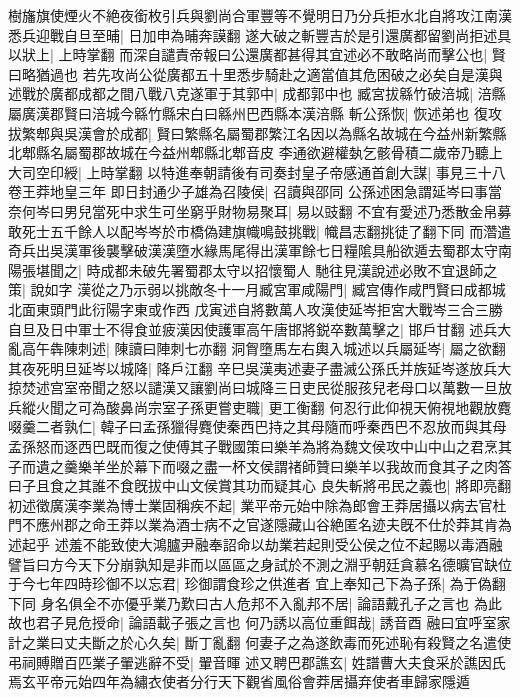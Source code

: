 樹旛旗使煙火不絶夜銜枚引兵與劉尚合軍豐等不覺明日乃分兵拒水北自將攻江南漢悉兵迎戰自旦至晡|{
	日加申為晡奔謨翻}
遂大破之斬豐吉於是引還廣都留劉尚拒述具以狀上|{
	上時掌翻}
而深自譴責帝報曰公還廣都甚得其宜述必不敢略尚而擊公也|{
	賢曰略猶過也}
若先攻尚公從廣都五十里悉步騎赴之適當值其危困破之必矣自是漢與述戰於廣都成都之間八戰八克遂軍于其郭中|{
	成都郭中也}
臧宮拔緜竹破涪城|{
	涪縣屬廣漢郡賢曰涪城今緜竹縣宋白曰緜州巴西縣本漢涪縣}
斬公孫恢|{
	恢述弟也}
復攻拔繁郫與吳漢會於成都|{
	賢曰繁縣名屬蜀郡繁江名因以為縣名故城在今益州新繁縣北郫縣名屬蜀郡故城在今益州郫縣北郫音皮}
李通欲避權埶乞骸骨積二歲帝乃聽上大司空印綬|{
	上時掌翻}
以特進奉朝請後有司奏封皇子帝感通首創大謀|{
	事見三十八卷王莽地皇三年}
即日封通少子雄為召陵侯|{
	召讀與邵同}
公孫述困急謂延岑曰事當奈何岑曰男兒當死中求生可坐窮乎財物易聚耳|{
	易以豉翻}
不宜有愛述乃悉散金帛募敢死士五千餘人以配岑岑於市橋偽建旗幟鳴鼓挑戰|{
	幟昌志翻挑徒了翻下同}
而濳遣奇兵出吳漢軍後襲擊破漢漢墮水緣馬尾得出漢軍餘七日糧隂具船欲遁去蜀郡太守南陽張堪聞之|{
	時成都未破先署蜀郡太守以招懷蜀人}
馳往見漢說述必敗不宜退師之策|{
	說如字}
漢從之乃示弱以挑敵冬十一月臧宮軍咸陽門|{
	臧宫傳作咸門賢曰成都城北面東頭門此衍陽字東或作西}
戊寅述自將數萬人攻漢使延岑拒宮大戰岑三合三勝自旦及日中軍士不得食並疲漢因使護軍高午唐邯將鋭卒數萬擊之|{
	邯戶甘翻}
述兵大亂高午犇陳刺述|{
	陳讀曰陣刺七亦翻}
洞胷墮馬左右輿入城述以兵屬延岑|{
	屬之欲翻}
其夜死明旦延岑以城降|{
	降戶江翻}
辛巳吳漢夷述妻子盡滅公孫氏并族延岑遂放兵大掠焚述宫室帝聞之怒以譴漢又讓劉尚曰城降三日吏民從服孩兒老母口以萬數一旦放兵縱火聞之可為酸鼻尚宗室子孫更嘗吏職|{
	更工衡翻}
何忍行此仰視天俯視地觀放麑啜羹二者孰仁|{
	韓子曰孟孫獵得麑使秦西巴持之其母隨而呼秦西巴不忍放而與其母孟孫怒而逐西巴既而復之使傅其子戰國策曰樂羊為將為魏文侯攻中山中山之君烹其子而遺之羹樂羊坐於幕下而啜之盡一杯文侯謂禇師贊曰樂羊以我故而食其子之肉答曰子且食之其誰不食旣拔中山文侯賞其功而疑其心}
良失斬將弔民之義也|{
	將即亮翻}
初述徵廣漢李業為博士業固稱疾不起|{
	業平帝元始中除為郎會王莽居攝以病去官杜門不應州郡之命王莽以業為酒士病不之官遂隱藏山谷絶匿名迹夫旣不仕於莽其肯為述起乎}
述羞不能致使大鴻臚尹融奉詔命以劫業若起則受公侯之位不起賜以毒酒融譬旨曰方今天下分崩孰知是非而以區區之身試於不測之淵乎朝廷貪慕名德曠官缺位于今七年四時珍御不以忘君|{
	珍御謂食珍之供進者}
宜上奉知己下為子孫|{
	為于偽翻下同}
身名俱全不亦優乎業乃歎曰古人危邦不入亂邦不居|{
	論語戴孔子之言也}
為此故也君子見危授命|{
	論語載子張之言也}
何乃誘以高位重餌哉|{
	誘音酉}
融曰宜呼室家計之業曰丈夫斷之於心久矣|{
	斷丁亂翻}
何妻子之為遂飲毒而死述恥有殺賢之名遣使弔祠賻贈百匹業子翬逃辭不受|{
	翬音暉}
述又聘巴郡譙玄|{
	姓譜曹大夫食采於譙因氏焉玄平帝元始四年為繡衣使者分行天下觀省風俗會莽居攝弃使者車歸家隱遁}
